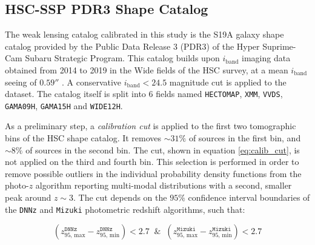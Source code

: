 \subsection{HSC-SSP PDR3 Shape Catalog}
\label{sec:data:hsc}

The weak lensing catalog calibrated in this study is the S19A galaxy shape catalog \cite{HSCShapeCataloguePDR3Li2022} provided by the Public Data Release 3 (PDR3) \cite{HSC2022datarelease3} of the Hyper Suprime-Cam Subaru Strategic Program. This catalog builds upon $i_{\mathrm{band}}$ imaging data obtained from 2014 to 2019 in the Wide fields of the HSC survey, at a mean $i_{\mathrm{band}}$ seeing of $0.59''$ \cite{HSCShapeCataloguePDR3Li2022}. A conservative $i_{\mathrm{band}}<24.5$ magnitude cut is applied to the dataset. The catalog itself is split into 6 fields named \texttt{HECTOMAP}, \texttt{XMM}, \texttt{VVDS}, \texttt{GAMA09H}, \texttt{GAMA15H} and \texttt{WIDE12H}. 

As a preliminary step, a \textit{calibration cut} is applied to the first two tomographic bins of the HSC shape catalog. 
It removes $\sim31\%$ of sources in the first bin, and $\sim8\%$ of sources in the second bin. The cut, shown in equation \ref{eq:calib_cut}, is not applied on the third and fourth bin. This selection is performed in order to remove possible outliers in the individual probability density functions from the photo-$z$ algorithm reporting multi-modal distributions with a second, smaller peak around $z\sim3$. The cut depends on the $95\%$ confidence interval boundaries of the \texttt{DNNz} \cite{DNNZHSCNishizawa2020} and \texttt{Mizuki} \cite{MizukiHSCTanaka2015} photometric redshift algorithms, such that:

\begin{equation}\label{eq:calib_cut}
(z^{\texttt{DNNz}}_{95,\,\mathrm{max}}-z^{\texttt{DNNz}}_{95,\,\mathrm{min}})<2.7\;\;\&\;\;(z^{\texttt{Mizuki}}_{95,\,\mathrm{max}}-z^{\texttt{Mizuki}}_{95,\,\mathrm{min}})<2.7
\end{equation}

